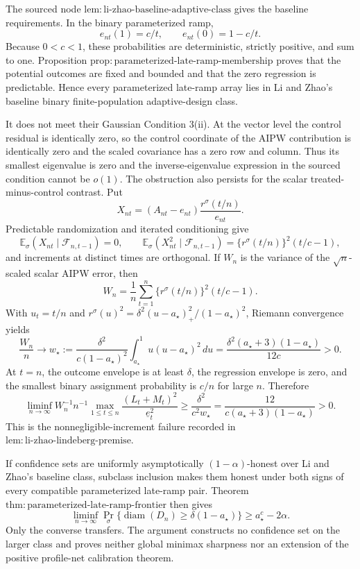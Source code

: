 The sourced node \(\mathrm{lem:li\mbox{-}zhao\mbox{-}baseline\mbox{-}adaptive\mbox{-}class}\) gives the baseline requirements. In the binary parameterized ramp,
\[
 e_{nt}(1)=c/t,
 \qquad
 e_{nt}(0)=1-c/t.
\]
Because \(0<c<1\), these probabilities are deterministic, strictly positive, and sum to one. Proposition \(\mathrm{prop:parameterized\mbox{-}late\mbox{-}ramp\mbox{-}membership}\) proves that the potential outcomes are fixed and bounded and that the zero regression is predictable. Hence every parameterized late-ramp array lies in Li and Zhao's baseline binary finite-population adaptive-design class.

It does not meet their Gaussian Condition 3(ii). At the vector level the control residual is identically zero, so the control coordinate of the AIPW contribution is identically zero and the scaled covariance has a zero row and column. Thus its smallest eigenvalue is zero and the inverse-eigenvalue expression in the sourced condition cannot be \(o(1)\). The obstruction also persists for the scalar treated-minus-control contrast. Put
\[
 X_{nt}=(A_{nt}-e_{nt})\frac{r^\sigma(t/n)}{e_{nt}}.
\]
Predictable randomization and iterated conditioning give
\[
 \mathbb E_\sigma(X_{nt}\mid\mathcal F_{n,t-1})=0,
 \qquad
 \mathbb E_\sigma(X_{nt}^2\mid\mathcal F_{n,t-1})
 =\{r^\sigma(t/n)\}^2(t/c-1),
\]
and increments at distinct times are orthogonal. If \(W_n\) is the variance of the \(\sqrt n\)-scaled scalar AIPW error, then
\[
 W_n=\frac1n\sum_{t=1}^n
 \{r^\sigma(t/n)\}^2(t/c-1).
\]
With \(u_t=t/n\) and
\(r^\sigma(u)^2=\delta^2(u-a_\star)_+^2/(1-a_\star)^2\), Riemann convergence yields
\[
 \frac{W_n}{n}\longrightarrow
 w_\star
 :=\frac{\delta^2}{c(1-a_\star)^2}
   \int_{a_\star}^1u(u-a_\star)^2\,du
 =\frac{\delta^2(a_\star+3)(1-a_\star)}{12c}>0.
\]
At \(t=n\), the outcome envelope is at least \(\delta\), the regression envelope is zero, and the smallest binary assignment probability is \(c/n\) for large \(n\). Therefore
\[
 \liminf_{n\to\infty}
 W_n^{-1}n^{-1}
 \max_{1\le t\le n}
 \frac{(L_t+M_t)^2}{\underline e_t^2}
 \ge\frac{\delta^2}{c^2w_\star}
 =\frac{12}{c(a_\star+3)(1-a_\star)}>0.
\]
This is the nonnegligible-increment failure recorded in \(\mathrm{lem:li\mbox{-}zhao\mbox{-}lindeberg\mbox{-}premise}\).

If confidence sets are uniformly asymptotically \((1-\alpha)\)-honest over Li and Zhao's baseline class, subclass inclusion makes them honest under both signs of every compatible parameterized late-ramp pair. Theorem \(\mathrm{thm:parameterized\mbox{-}late\mbox{-}ramp\mbox{-}frontier}\) then gives
\[
 \liminf_{n\to\infty}
 \Pr_\sigma\{\operatorname{diam}(D_n)
                 \ge\delta(1-a_\star)\}
 \ge a_\star^c-2\alpha.
\]
Only the converse transfers. The argument constructs no confidence set on the larger class and proves neither global minimax sharpness nor an extension of the positive profile-net calibration theorem.
